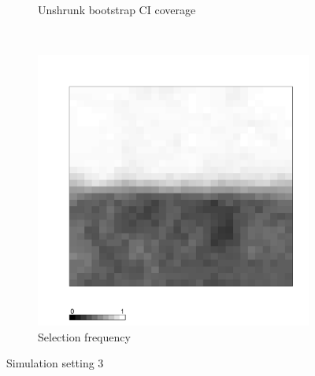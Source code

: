 \documentclass[authoryear, review, 11pt]{elsarticle}
\begin{document}
\begin{figure}
\begin{subfigure}[b]{0.45\textwidth}
		\caption{Unshrunk bootstrap CI coverage}
	\end{subfigure}%
	~ %
	\begin{subfigure}[b]{0.45\textwidth}
	\centering
		\includegraphics[width=\textwidth]{../../figures/simulation/X1.15.3.selection.pdf}
		\caption{Selection frequency}
	\end{subfigure}
	\caption{Simulation setting 3}
\end{figure}

\clearpage
\end{document}
